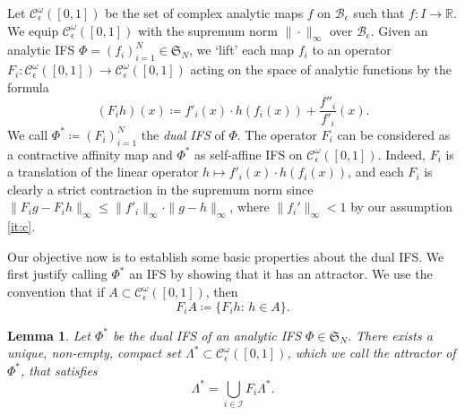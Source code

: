 \documentclass[11pt,a4paper]{article}
\def\cref#1{\ref{#1}}%
\newtheorem{lemma}[theorem]{Lemma}
\theoremstyle{definition}
\theoremstyle{remark}
\newcommand{\0}{\mathbf{0}}
\numberwithin{equation}{section}
\begin{document}
Let $\mathcal{C}_\epsilon^\omega([0,1])$ be the set of complex analytic maps $f$ on
$\mathcal{B}_{\epsilon}$ such that $f\colon I \to \mathbb{R}$. We equip
$\mathcal{C}_\epsilon^\omega([0,1])$ with the supremum norm $\|\cdot\|_\infty$ over
$\mathcal{B}_\epsilon$. Given an analytic IFS $\Phi=(f_i)_{i=1}^N\in\mathfrak{S}_N$, we `lift' each
map $f_i$ to an operator $F_i:
\mathcal{C}^{\omega}_\epsilon([0,1]) \to \mathcal{C}_\epsilon^{\omega}([0,1])$ acting on the space of analytic
functions by the formula
\begin{equation}\label{eq:LiftedIFS}
	(F_i h)(x)\coloneqq f'_i(x)\cdot h(f_i(x)) + \frac{f''_i}{f'_i}(x).
\end{equation}
We call $\Phi^*\coloneqq(F_i)_{i=1}^N$ the \emph{dual IFS} of $\Phi$. The operator $F_i$ can be
considered as a contractive affinity map and $\Phi^*$ as self-affine IFS on
$\mathcal{C}_\epsilon^\omega([0,1])$.  Indeed, $F_i$ is a translation of the linear operator
$h\mapsto f'_i(x)\cdot h(f_i(x))$, and each $F_i$ is clearly a strict contraction in the supremum
norm since $\|F_ig-F_ih\|_{\infty}\leq \|f'_i\|_{\infty}\cdot\|g-h\|_{\infty}$, where
$\|f_i'\|_\infty<1$ by our assumption \cref{it:c}.

Our objective now is to establish some basic properties about the dual IFS. We first justify calling
$\Phi^*$ an IFS by showing that it has an attractor. We use the convention that if $A\subset
\mathcal{C}^{\omega}_\epsilon([0,1])$, then
\begin{equation*}
	F_iA \coloneqq \{F_i h:\, h\in A\}.
\end{equation*}
\begin{lemma}\label{lem:ExistanceAttractor}
	Let $\Phi^*$ be the dual IFS of an analytic IFS $\Phi\in\mathfrak{S}_N$. There exists a
	unique, non-empty, compact set $\Lambda^*\subset \mathcal{C}^{\omega}_\epsilon([0,1])$,
	which we call the \emph{attractor} of $\Phi^*$, that satisfies
	\begin{equation*}
		\Lambda^*=\bigcup_{i\in\mathcal{I}} F_i\Lambda^*.
	\end{equation*} 
\end{lemma} 
\end{document}
